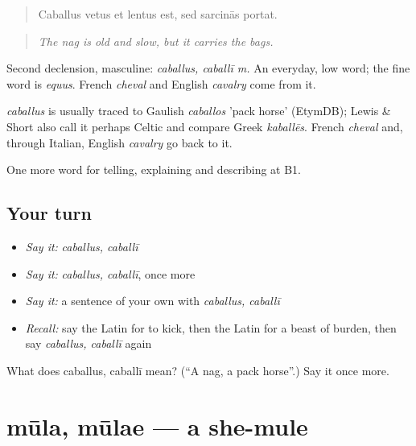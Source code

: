 \begin{quote}
Caballus vetus et lentus est, sed sarcinās portat.
\end{quote}

\begin{quote}
\emph{The nag is old and slow, but it carries the bags.}
\end{quote}

Second declension, masculine: \emph{caballus, caballī m.} An everyday, low word; the fine word is \emph{equus}. French \emph{cheval} and English \emph{cavalry} come from it.

\begin{cousinweb}
\emph{caballus} is usually traced to Gaulish \emph{caballos} 'pack horse' (EtymDB); Lewis \& Short also call it perhaps Celtic and compare Greek \emph{kaballēs}. French \emph{cheval} and, through Italian, English \emph{cavalry} go back to it.
\end{cousinweb}

\begin{grammarlens}[title={What you've built}]
One more word for telling, explaining and describing at B1.
\end{grammarlens}

\subsection*{Your turn}
\begin{itemize}
\raggedright
  \item \emph{Say it:} \emph{caballus, caballī}
  \item \emph{Say it:} \emph{caballus, caballī}, once more
  \item \emph{Say it:} a sentence of your own with \emph{caballus, caballī}
  \item \emph{Recall:} say the Latin for to kick, then the Latin for a beast of burden, then say \emph{caballus, caballī} again
\end{itemize}

\begin{tcolorbox}[breakable,colback=teal!4,colframe=teal!35!black,title={Before you move on}]
What does caballus, caballī mean? (\textquotedblleft{}A nag, a pack horse\textquotedblright{}.) Say it once more.
\end{tcolorbox}
\section[mūla, mūlae]{mūla, mūlae — a she-mule}

